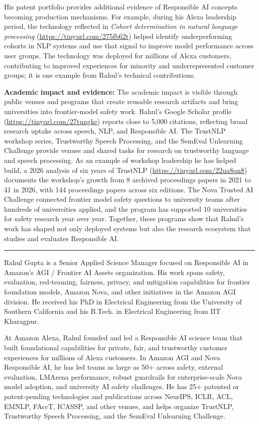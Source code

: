 \documentclass[10pt]{article}
\newcommand{\sectionhead}[1]{\vspace{5pt}{\large\bfseries\color[HTML]{0F3D4F}#1}\par\vspace{2pt}\hrule\vspace{4pt}}
\begin{document}
His patent portfolio provides additional evidence of Responsible AI concepts becoming production mechanisms. For example, during his Alexa leadership period, the technology reflected in \textit{Cohort determination in natural language processing} (\url{https://tinyurl.com/275fb62t}) helped identify underperforming cohorts in NLP systems and use that signal to improve model performance across user groups. The technology was deployed for millions of Alexa customers, contributing to improved experiences for minority and underrepresented customer groups; it is one example from Rahul's technical contributions.

\textbf{Academic impact and evidence:} The academic impact is visible through public venues and programs that create reusable research artifacts and bring universities into frontier-model safety work. Rahul's Google Scholar profile (\url{https://tinyurl.com/27tungke}) reports close to 5,000 citations, reflecting broad research uptake across speech, NLP, and Responsible AI. The TrustNLP workshop series, Trustworthy Speech Processing, and the SemEval Unlearning Challenge provide venues and shared tasks for research on trustworthy language and speech processing. As an example of workshop leadership he has helped build, a 2026 analysis of six years of TrustNLP (\url{https://tinyurl.com/22ua8qn8}) documents the workshop's growth from 8 archived proceedings papers in 2021 to 41 in 2026, with 144 proceedings papers across six editions. The Nova Trusted AI Challenge connected frontier model safety questions to university teams after hundreds of universities applied, and the program has supported 10 universities for safety research year over year. Together, these programs show that Rahul's work has shaped not only deployed systems but also the research ecosystem that studies and evaluates Responsible AI.

\sectionhead{7. Brief Biography or Link to CV}
Rahul Gupta is a Senior Applied Science Manager focused on Responsible AI in Amazon's AGI / Frontier AI Assets organization. His work spans safety, evaluation, red-teaming, fairness, privacy, and mitigation capabilities for frontier foundation models, Amazon Nova, and other initiatives in the Amazon AGI division. He received his PhD in Electrical Engineering from the University of Southern California and his B.Tech. in Electrical Engineering from IIT Kharagpur.

At Amazon Alexa, Rahul founded and led a Responsible AI science team that built foundational capabilities for private, fair, and trustworthy customer experiences for millions of Alexa customers. In Amazon AGI and Nova Responsible AI, he has led teams as large as 50+ across safety, external evaluation, LMArena performance, robust guardrails for enterprise-scale Nova model adoption, and university AI safety challenges. He has 25+ patented or patent-pending technologies and publications across NeurIPS, ICLR, ACL, EMNLP, FAccT, ICASSP, and other venues, and helps organize TrustNLP, Trustworthy Speech Processing, and the SemEval Unlearning Challenge.
\end{document}
